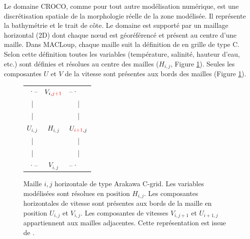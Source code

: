 \documentclass[10pt,a4paper,titlepage]{article}
\begin{document}
    Le domaine CROCO, comme pour tout autre modélisation numérique, est une discrétisation spatiale de la morphologie réelle de la zone modélisée.
    Il représente la bathymétrie et le trait de côte.
    Le domaine est supporté par un maillage horizontal (2D) dont chaque n\oe{}ud est géoréférencé et présent au centre d'une maille.
    Dans MACLoup, chaque maille suit la définition de \cite{Arakawa_C-grid_1977} en grille de type C.
    Selon cette définition toutes les variables (température, salinité, hauteur d'eau, etc.) sont définies et résolues au centre des mailles ($H_{i,j}$, Figure \ref{fig:structure_maille horizontale}).
    Seules les composantes $U$ et $V$ de la vitesse sont présentes aux bords des mailles (Figure \ref{fig:structure_maille horizontale}).
    \begin{figure}[h!]
        \centering
        \begin{tabular}{ c c c }
            \multicolumn{1}{r}{·--} & $V_{i,{\color{red}j+1}}$ & \multicolumn{1}{l}{--·} \\
            | & & | \\
            | & & | \\
            $U_{i,j}$ & $H_{i,j}$ & $U_{{\color{red}i+1},j}$ \\
            | & & | \\
            | & & | \\
            \multicolumn{1}{r}{·--} & \textbf{$V_{i,j}$} & \multicolumn{1}{l}{--·}
        \end{tabular}
        \caption{
            Maille $i,j$ horizontale de type Arakawa C-grid.
            Les variables modélisées sont résolues en position $H_{i,j}$.
            Les composantes horizontales de vitesse sont présentes aux bords de la maille en position $U_{i,j}$ et $V_{i,j}$.
            Les composantes de vitesses $V_{i,j+1}$ et $U_{i+1,j}$ appartiennent aux mailles adjacentes.
            Cette représentation est issue de \cite{grid_doc}.
        }
        \label{fig:structure_maille horizontale}
    \end{figure}
    
\end{document}
